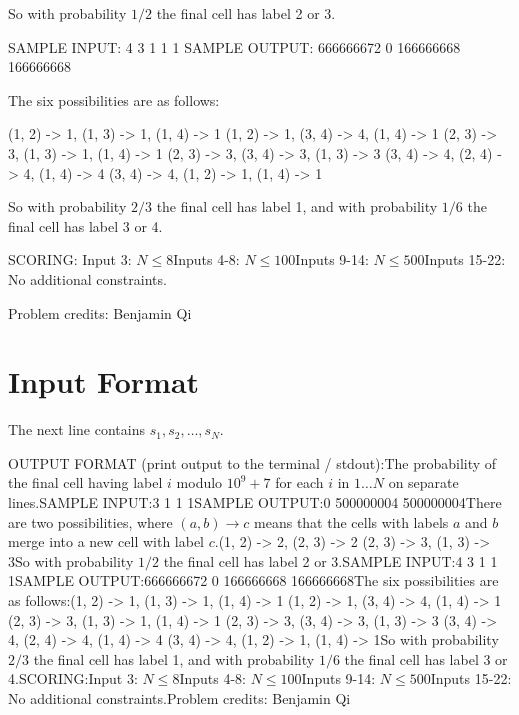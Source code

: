 \documentclass[12pt]{article}
\begin{document}
So with probability $1/2$ the final cell has label 2 or 3.

SAMPLE INPUT:
4
3 1 1 1
SAMPLE OUTPUT: 
666666672
0
166666668
166666668

The six possibilities are as follows:


(1, 2) -> 1, (1, 3) -> 1, (1, 4) -> 1
(1, 2) -> 1, (3, 4) -> 4, (1, 4) -> 1
(2, 3) -> 3, (1, 3) -> 1, (1, 4) -> 1
(2, 3) -> 3, (3, 4) -> 3, (1, 3) -> 3
(3, 4) -> 4, (2, 4) -> 4, (1, 4) -> 4
(3, 4) -> 4, (1, 2) -> 1, (1, 4) -> 1

So with probability $2/3$ the final cell has label 1, and with probability $1/6$
the final cell has label 3 or 4.

SCORING:
Input 3: $N\le 8$Inputs 4-8: $N\le 100$Inputs 9-14: $N\le 500$Inputs 15-22: No additional constraints.


Problem credits: Benjamin Qi



\section*{Input Format}
The next line contains $s_1,s_2,\dots, s_N$.

OUTPUT FORMAT (print output to the terminal / stdout):The probability of the final cell having label $i$ modulo $10^9+7$ for each $i$ in $1\dots N$ on
separate lines.SAMPLE INPUT:3
1 1 1SAMPLE OUTPUT:0
500000004
500000004There are two possibilities, where $(a,b)\to c$ means that the cells with labels
$a$ and $b$ merge into a new cell with label $c$.(1, 2) -> 2, (2, 3) -> 2
(2, 3) -> 3, (1, 3) -> 3So with probability $1/2$ the final cell has label 2 or 3.SAMPLE INPUT:4
3 1 1 1SAMPLE OUTPUT:666666672
0
166666668
166666668The six possibilities are as follows:(1, 2) -> 1, (1, 3) -> 1, (1, 4) -> 1
(1, 2) -> 1, (3, 4) -> 4, (1, 4) -> 1
(2, 3) -> 3, (1, 3) -> 1, (1, 4) -> 1
(2, 3) -> 3, (3, 4) -> 3, (1, 3) -> 3
(3, 4) -> 4, (2, 4) -> 4, (1, 4) -> 4
(3, 4) -> 4, (1, 2) -> 1, (1, 4) -> 1So with probability $2/3$ the final cell has label 1, and with probability $1/6$
the final cell has label 3 or 4.SCORING:Input 3: $N\le 8$Inputs 4-8: $N\le 100$Inputs 9-14: $N\le 500$Inputs 15-22: No additional constraints.Problem credits: Benjamin Qi
\end{document}
